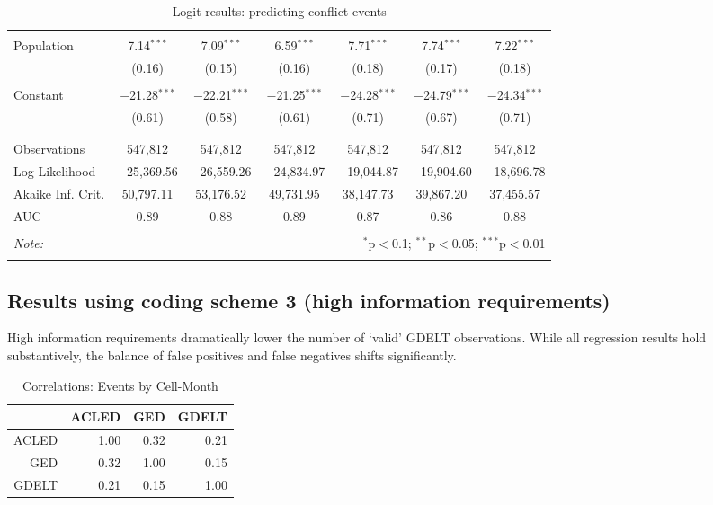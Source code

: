 \documentclass[hidelinks]{article}
\begin{document}
\begin{table}[!htbp]
\begin{tabular}{@{\extracolsep{5pt}}lcccccc}
  & & & & & & \\ 
Population & 7.14$^{***}$ & 7.09$^{***}$ & 6.59$^{***}$ & 7.71$^{***}$ & 7.74$^{***}$ & 7.22$^{***}$ \\ 
  & (0.16) & (0.15) & (0.16) & (0.18) & (0.17) & (0.18) \\ 
  & & & & & & \\ 
 Constant & $-$21.28$^{***}$ & $-$22.21$^{***}$ & $-$21.25$^{***}$ & $-$24.28$^{***}$ & $-$24.79$^{***}$ & $-$24.34$^{***}$ \\ 
  & (0.61) & (0.58) & (0.61) & (0.71) & (0.67) & (0.71) \\ 
  & & & & & & \\ 
\hline \\[-1.8ex] 
Observations & 547,812 & 547,812 & 547,812 & 547,812 & 547,812 & 547,812 \\ 
Log Likelihood & $-$25,369.56 & $-$26,559.26 & $-$24,834.97 & $-$19,044.87 & $-$19,904.60 & $-$18,696.78 \\ 
Akaike Inf. Crit. & 50,797.11 & 53,176.52 & 49,731.95 & 38,147.73 & 39,867.20 & 37,455.57 \\ 
AUC & 0.89 & 0.88 & 0.89 & 0.87 & 0.86 & 0.88\\
\hline 
\hline \\[-1.8ex] 
\textit{Note:}  & \multicolumn{6}{r}{$^{*}$p$<$0.1; $^{**}$p$<$0.05; $^{***}$p$<$0.01} \\ 
\normalsize 
\end{tabular} 
\caption{Logit results: predicting conflict events}
\end{table}

\newpage
\subsection{Results using coding scheme 3 (high information requirements)}
High information requirements dramatically lower the number of `valid' GDELT observations. While all regression results hold substantively, the balance of false positives and false negatives shifts significantly.
\begin{table}[ht]
\centering
\begin{tabular}{rrrr}
  \hline
 & ACLED & GED & GDELT \\ 
  \hline
ACLED & 1.00 & 0.32 & 0.21 \\ 
  GED & 0.32 & 1.00 & 0.15 \\ 
GDELT & 0.21 & 0.15 & 1.00 \\ 
   \hline
\end{tabular}
\caption{Correlations: Events by Cell-Month} 
\end{table}
\end{document}
